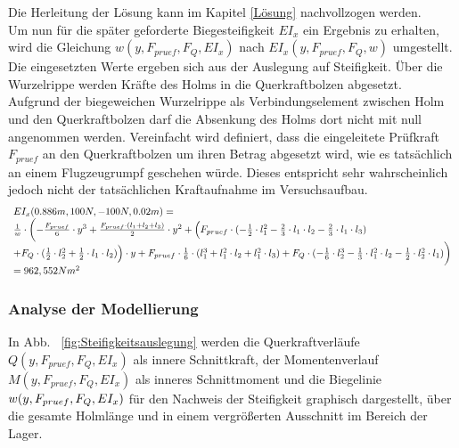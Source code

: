 Die Herleitung der Lösung kann im Kapitel \ref{Lösung} nachvollzogen werden.\\

\noindent Um nun für die später geforderte Biegesteifigkeit $EI_{x}$ ein Ergebnis zu erhalten, wird die Gleichung $w(y,F_{pruef},F_{Q}, EI_{x})$ nach $EI_{x}(y,F_{pruef},F_{Q},w)$ umgestellt. Die eingesetzten Werte ergeben sich aus der Auslegung auf Steifigkeit. Über die Wurzelrippe werden Kräfte des Holms in die Querkraftbolzen abgesetzt. Aufgrund der biegeweichen Wurzelrippe als Verbindungselement zwischen Holm und den Querkraftbolzen darf die Absenkung des Holms dort nicht mit null angenommen werden. Vereinfacht wird definiert, dass die eingeleitete Prüfkraft $F_{pruef}$ an den Querkraftbolzen um ihren Betrag abgesetzt wird, wie es tatsächlich an einem Flugzeugrumpf geschehen würde. Dieses entspricht sehr wahrscheinlich jedoch nicht der tatsächlichen Kraftaufnahme im Versuchsaufbau.
\begin{equation}\label{EIx}
	\begin{array}{l}
		EI_{x}(0.886m, 100N, -100N, 0.02m)= \\
		\frac{1}{w}\cdot\biggl(-\frac{F_{pruef}}{6}\cdot y^{3} + \frac{ F_{pruef}\cdot (l_{1}+l_{2}+l_{3})}{2}\cdot y^{2} + \Bigl(F_{pruef}\cdot(-\frac{1}{2}\cdot l_{1}^{2} -\frac{2}{3}\cdot l_{1}\cdot l_{2}-\frac{2}{3}\cdot l_{1}\cdot l_{3}) \\ +F_{Q}\cdot(\frac{1}{2}\cdot l_{2}^{2}+\frac{1}{2}\cdot l_{1}\cdot l_{2})\Bigr)\cdot y + F_{pruef}\cdot\frac{1}{6}\cdot(l_{1}^{3}+l_{1}^{2}\cdot l_{2}+l_{1}^{2}\cdot l_{3}) + F_{Q}\cdot(-\frac{1}{6}\cdot l_{2}^{3}-\frac{1}{3}\cdot l_{1}^{2}\cdot l_{2}-\frac{1}{2}\cdot l_{2}^{2}\cdot l_{1})\biggr)\\
		=962,552Nm^{2}
	\end{array}
\end{equation}

\subsubsection{Analyse der Modellierung}
In Abb. ~\ref{fig:Steifigkeitsauslegung} werden die Querkraftverläufe $Q(y,F_{pruef},F_{Q},EI_{x})$ als innere Schnittkraft, der Momentenverlauf $M(y,F_{pruef},F_{Q},EI_{x})$ als inneres Schnittmoment und die Biegelinie $w(y,F_{pruef},F_{Q},\\EI_{x})$ für den Nachweis der Steifigkeit graphisch dargestellt, über die gesamte Holmlänge und in einem vergrößerten Ausschnitt im Bereich der Lager. \\

